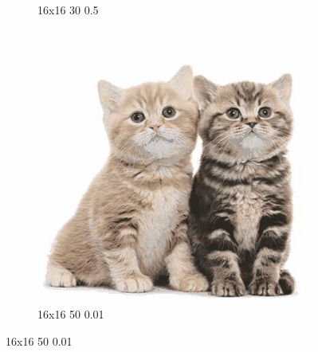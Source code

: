 \documentclass[12pt,a4paper]{article}
\begin{document}
\begin{figure}[H]
\begin{subfigure}{0.25\textwidth}
  \caption{16x16 30 0.5}
  \label{fig:4}
\end{subfigure}\hfil %
\begin{subfigure}{0.25\textwidth}
  \includegraphics[width=\linewidth]{images/big/16-16-50-001}
  \caption{16x16 50 0.01}
  \label{fig:5}
\end{subfigure}\hfil %


\end{figure}
\end{document}
